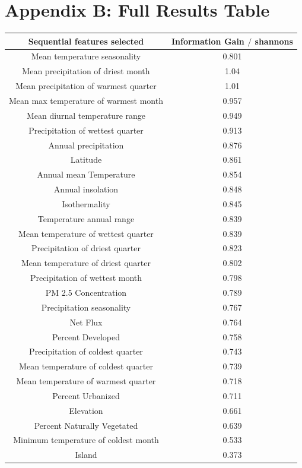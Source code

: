 \documentclass[prl,showpacs,superscriptaddress,twocolumn,longbibliography]{revtex4-1}
\begin{document}
\section{Appendix B: Full Results Table} \label{appendix:results}
\begin{center}\begin{tabular}{||c c||}
 \hline
Sequential features selected & Information Gain $/$ shannons \\
 \hline\hline
 Mean temperature seasonality & 0.801\\ 
 \hline
 Mean precipitation of driest month & 1.04\\
 \hline
 Mean precipitation of warmest quarter &  1.01\\
 \hline
 Mean max temperature of warmest month &  0.957\\
 \hline
 Mean diurnal temperature range & 0.949\\
 \hline
 Precipitation of wettest quarter & 0.913\\
 \hline
 Annual precipitation & 0.876\\
 \hline
 Latitude & 0.861\\
 \hline
 Annual mean Temperature & 0.854\\
 \hline 
 Annual insolation & 0.848\\ 
 \hline
 Isothermality & 0.845\\
 \hline
 Temperature annual range & 0.839\\
 \hline
 Mean temperature of wettest quarter & 0.839\\
 \hline
 Precipitation of driest quarter & 0.823\\
 \hline
 Mean temperature of driest quarter & 0.802\\
 \hline
 Precipitation of wettest month & 0.798\\
 \hline
 PM 2.5 Concentration & 0.789\\
 \hline
 Precipitation seasonality & 0.767\\
 \hline
 Net Flux & 0.764\\
 \hline
 Percent Developed & 0.758\\
 \hline
 Precipitation of coldest quarter & 0.743\\
 \hline
 Mean temperature of coldest quarter & 0.739\\
 \hline
 Mean temperature of warmest quarter & 0.718\\
 \hline
 Percent Urbanized & 0.711\\
 \hline
 Elevation & 0.661\\
 \hline
 Percent Naturally Vegetated & 0.639\\
 \hline
 Minimum temperature of coldest month & 0.533\\
 \hline
 Island & 0.373\\[1ex]
 \hline
 
 
 
\end{tabular}
\end{center}
\end{document}
